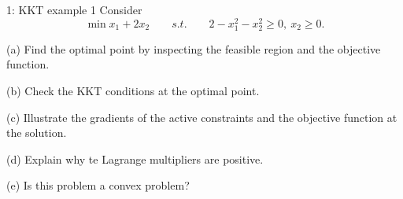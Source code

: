 
\begin{problem}{1: KKT example 1}
Consider
\[
  \min x_1 + 2x_2 \qquad s.t. \qquad 2 - x_1^2-x_2^2 \geq 0 ,\ x_2 \geq 0
.\] 

(a) Find the optimal point by inspecting the feasible region and the objective function.

\medskip

(b) Check the KKT conditions at the optimal point.

\medskip

(c) Illustrate the gradients of the active constraints and the objective function at the solution. 

\medskip

(d) Explain why te Lagrange multipliers are positive. 

\medskip

(e) Is this problem a convex problem? 

\end{problem}


